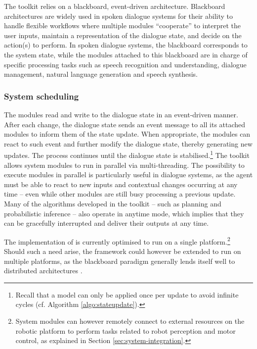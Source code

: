 The \opendial{} toolkit relies on a blackboard, event-driven architecture. Blackboard architectures are widely used in spoken dialogue systems for their ability to handle flexible workflows where multiple modules ``cooperate'' to  interpret the user inputs, maintain a representation of the dialogue state, and decide on the action(s) to perform. In spoken dialogue systems, the blackboard corresponds to the system state, while the modules attached to this blackboard are in charge of specific processing tasks such as speech recognition and understanding, dialogue management, natural language generation and speech synthesis. 


\subsubsection*{System scheduling}

The modules read and write to the dialogue state in an event-driven manner. After each change, the dialogue state sends an event message to all its attached modules to inform them of the state update. When appropriate, the modules can react to such event and further modify the dialogue state, thereby generating new updates. The process continues until the dialogue state is stabilised.\footnote{Recall that a model can only be applied once per update to avoid infinite cycles (cf. Algorithm \ref{algo:stateupdate}).}   The \opendial{} toolkit allows system modules to run in parallel via multi-threading. The possibility to execute modules in parallel is particularly useful in dialogue systems, as the agent must be able to react to new inputs and contextual changes occurring at any time -- even while other modules are still busy processing a previous update.  Many of the algorithms developed in the toolkit -- such as planning and probabilistic inference -- also operate in anytime mode, which implies that they can be gracefully interrupted and deliver their outputs at any time.

The implementation of \opendial{} is currently optimised to run on a single platform.\footnote{System modules can however remotely connect to external resources on the robotic platform to perform tasks related to robot perception and motor control, as explained in Section \ref{sec:system-integration}.} Should such a need arise, the framework could however be extended to run on multiple platforms, as the blackboard paradigm generally lends itself well to distributed architectures \citep{Corkill:1988}.


